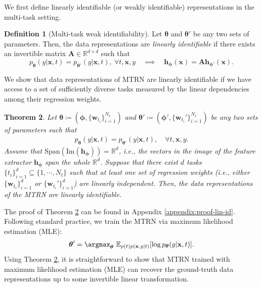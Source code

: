 \documentclass[10pt]{article} %
\theoremstyle{plain}
\newtheorem{theorem}{Theorem}[section]
\theoremstyle{definition}
\newtheorem{definition}[theorem]{Definition}
\begin{document}
We first define linearly identifiable (or weakly identifiable) representations in the multi-task setting.
\begin{definition}[Multi-task weak identifiability]\label{def:weak-id}
    Let $\boldsymbol{\theta}$ and $\boldsymbol{\theta}'$ be any two sets of parameters. Then, the data representations are \textit{linearly identifiable} if there exists an invertible matrix $\mathbf{A}\in\mathbb{R}^{d\times d}$ such that
    \begin{equation}
        p_{\boldsymbol{\theta}}(y|\mathbf{x},t)=p_{\boldsymbol{\theta}'}(y|\mathbf{x},t),~\forall t,\mathbf{x},y 
        \quad\implies\quad
        \mathbf{h}_{\boldsymbol{\phi}}(\mathbf{x})=\mathbf{A}\mathbf{h}_{\boldsymbol{\phi}'}(\mathbf{x}).
    \end{equation}
\end{definition}
We show that data representations of MTRN are linearly identifiable if we have access to a set of sufficiently diverse tasks measured by the linear dependencies among their regression weights. 
\begin{theorem}\label{thm:lin-id}
    Let $\boldsymbol{\theta}\coloneqq(\boldsymbol{\phi},\{\mathbf{w}_{t_i}\}_{i=1}^{N_t})$ and $\boldsymbol{\theta}'\coloneqq(\boldsymbol{\phi}',\{\mathbf{w}_{t_i}'\}_{i=1}^{N_t})$ be any two sets of parameters such that
    \begin{align}
        p_{\boldsymbol{\theta}}(y|\mathbf{x},t)=p_{\boldsymbol{\theta}'}(y|\mathbf{x},t),\quad\forall t,\mathbf{x},y.
    \end{align}
    Assume that $\text{Span}(\text{Im}(\mathbf{h}_{\boldsymbol{\phi}}))=\mathbb{R}^d$, i.e., the vectors in the image of the feature extractor $\mathbf{h}_{\boldsymbol{\phi}}$ span the whole $\mathbb{R}^d$. Suppose that there exist $d$ tasks $\{t_i\}_{i=1}^d\subseteq\{1,\cdots,N_t\}$ such that at least one set of regression weights (i.e., either $\{\mathbf{w}_{t_i}\}_{i=1}^d$ or $\{\mathbf{w}_{t_i}'\}_{i=1}^d$) are linearly independent.
    Then, the data representations of the MTRN are linearly identifiable.
\end{theorem}
The proof of Theorem \ref{thm:lin-id} can be found in Appendix \ref{appendix:proof-lin-id}.
Following standard practice, we train the MTRN via maximum likelihood estimation (MLE):
\begin{align}\label{eq:mtrn-loss} 
\boldsymbol{\theta}'=\argmax_{\boldsymbol{\theta}}~\mathbb{E}_{p(t)p(\mathbf{x},y|t)}[\log p_{\boldsymbol{\theta}}(y|\mathbf{x},t)].
\end{align}
Using Theorem \ref{thm:lin-id}, it is straightforward to show that MTRN trained with maximum likelihood estimation (MLE) can recover the ground-truth data representations up to some invertible linear transformation.
\end{document}
